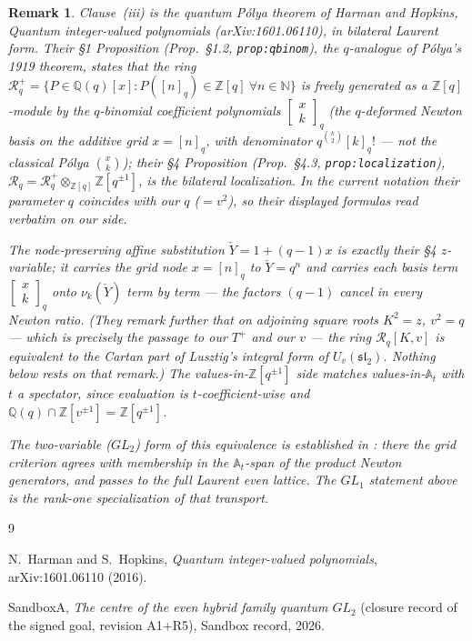 \documentclass[11pt]{article}
\newtheorem{remark}{Remark}
\newcommand{\At}{\mathbb{A}_t}
\newcommand{\Yc}{\check Y}
\newcommand{\Z}{\mathbb Z}
\begin{document}
\begin{remark}
Clause~(iii) is the quantum P\'olya theorem of Harman and Hopkins,
\emph{Quantum integer-valued polynomials} (arXiv:1601.06110), in bilateral
Laurent form. Their \S1 Proposition (Prop.~\S1.2, \texttt{prop:qbinom}), the
$q$-analogue of P\'olya's 1919 theorem, states that the ring
$\mathcal R_q^{+}=\{P\in\mathbb Q(q)[x]:P([n]_q)\in\Z[q]\ \forall n\in\mathbb N\}$
is freely generated as a $\Z[q]$-module by the $q$-binomial coefficient
polynomials $\begin{bmatrix}x\\k\end{bmatrix}_{q}$ (the $q$-deformed Newton
basis on the \emph{additive} grid $x=[n]_q$, with denominator
$q^{\binom{k}{2}}[k]_q!$ --- not the classical P\'olya $\binom{x}{k}$); their \S4
Proposition (Prop.~\S4.3, \texttt{prop:localization}),
$\mathcal R_q=\mathcal R_q^{+}\otimes_{\Z[q]}\Z[q^{\pm1}]$, is the bilateral
localization. In the current notation their parameter $q$ coincides with our
$q$ ($=v^{2}$), so their displayed formulas read verbatim on our side.

The node-preserving affine substitution $\Yc=1+(q-1)x$ is exactly their \S4
$z$-variable; it carries the grid node $x=[n]_q$ to $\Yc=q^{n}$ and carries each
basis term $\begin{bmatrix}x\\k\end{bmatrix}_{q}$ onto $\nu_k(\Yc)$ \emph{term by
term} --- the factors $(q-1)$ cancel in every Newton ratio. (They remark further
that on adjoining square roots $K^{2}=z$, $v^{2}=q$ --- which is precisely the
passage to our $T^{+}$ and our $v$ --- the ring $\mathcal R_q[K,v]$ is equivalent
to the Cartan part of Lusztig's integral form of $U_v(\mathfrak{sl}_2)$. Nothing
below rests on that remark.) The values-in-$\Z[q^{\pm1}]$
side matches values-in-$\At$ with $t$ a spectator, since evaluation is
$t$-coefficient-wise and $\mathbb Q(q)\cap\Z[v^{\pm1}]=\Z[q^{\pm1}]$.

The two-variable ($GL_2$) form of this equivalence is established in
\cite{SandboxGL2}: there the grid criterion agrees with membership in the
$\At$-span of the product Newton generators, and passes to the full Laurent
even lattice. The $GL_1$ statement above is the rank-one specialization of
that transport.
\end{remark}

\begin{thebibliography}{9}

N.~Harman and S.~Hopkins,
\emph{Quantum integer-valued polynomials},
arXiv:1601.06110 (2016).

SandboxA,
\emph{The centre of the even hybrid family quantum $GL_2$}
(closure record of the signed goal, revision A1+R5),
Sandbox record, 2026.

\end{thebibliography}
\end{document}
